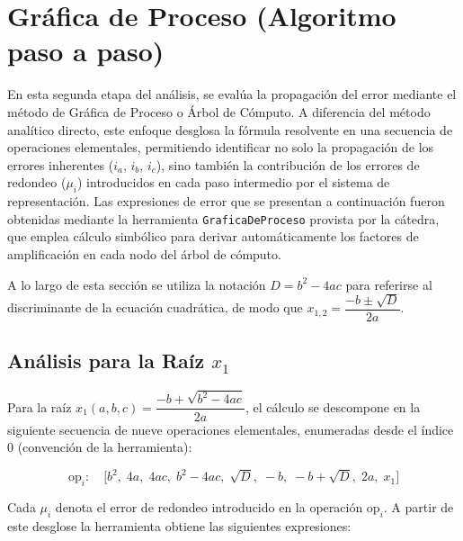 \section{Gráfica de Proceso (Algoritmo paso a paso)}

En esta segunda etapa del análisis, se evalúa la propagación del error mediante el método de
Gráfica de Proceso o Árbol de Cómputo. A diferencia del método analítico directo, este enfoque
desglosa la fórmula resolvente en una secuencia de operaciones elementales, permitiendo
identificar no solo la propagación de los errores inherentes ($i_a$, $i_b$, $i_c$), sino también
la contribución de los errores de redondeo ($\mu_i$) introducidos en cada paso intermedio por el
sistema de representación. Las expresiones de error que se presentan a continuación fueron
obtenidas mediante la herramienta \texttt{GraficaDeProceso} provista por la cátedra, que emplea
cálculo simbólico para derivar automáticamente los factores de amplificación en cada nodo del
árbol de cómputo.

A lo largo de esta sección se utiliza la notación $D = b^2 - 4ac$ para referirse al discriminante
de la ecuación cuadrática, de modo que $x_{1,2} = \dfrac{-b \pm \sqrt{D}}{2a}$.

\subsection{Análisis para la Raíz \texorpdfstring{$x_1$}{x1}}

Para la raíz $x_1(a,b,c) = \dfrac{-b + \sqrt{b^2 - 4ac}}{2a}$, el cálculo se descompone en la
siguiente secuencia de nueve operaciones elementales, enumeradas desde el índice $0$
(convención de la herramienta):

\begin{equation*}
    \text{op}_i:\quad
    \bigl[b^2,\;4a,\;4ac,\;b^2-4ac,\;\sqrt{D},\;-b,\;-b+\sqrt{D},\;2a,\;x_1\bigr]
\end{equation*}

Cada $\mu_i$ denota el error de redondeo introducido en la operación $\text{op}_i$.
A partir de este desglose la herramienta obtiene las siguientes expresiones:

